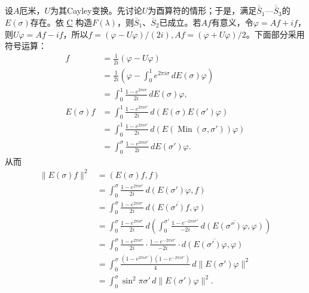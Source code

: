 \documentclass[fontsize=13pt,twoside,openany,headings=normal,parskip=false,bookmarkpackage=false,DIV=calc]{scrbook}
\begin{document}
设$A$厄米，$U$为其Cayley变换。先讨论$U$为酉算符的情形；于是，满足$\hyperref[cond:II.Sdouble1]{\overline{\overline S}_1}$—$\hyperref[cond:II.Sdouble3]{\overline{\overline S}_3}$的$E(\sigma)$存在。依 \hyperref[eq:II.9.C]{C} 构造$F(\lambda)$，则$\hyperref[cond:II.Sbar1]{\overline S_1}$、$\hyperref[cond:II.Sbar2]{\overline S_2}$已成立。若$Af$有意义，令$\varphi=Af+if$，则$U\varphi=Af-if$，所以$f=(\varphi-U\varphi)/(2i),\allowbreak Af=(\varphi+U\varphi)/2$。下面部分采用符号运算：
\begin{align*}
f&=\frac1{2i}(\varphi-U\varphi)\\
&=\frac1{2i}\left(\varphi-\int_0^1e^{2\pi i\sigma}\,dE(\sigma)\varphi\right)\\
&=\int_0^1\frac{1-e^{2\pi i\sigma}}{2i}\,dE(\sigma)\varphi,\\
E(\sigma)f&=\int_0^1\frac{1-e^{2\pi i\sigma'}}{2i}\,d(E(\sigma)E(\sigma')\varphi)\\
&=\int_0^1\frac{1-e^{2\pi i\sigma'}}{2i}\,d(E(\operatorname{Min}(\sigma,\sigma'))\varphi)\\
&=\int_0^\sigma\frac{1-e^{2\pi i\sigma'}}{2i}\,dE(\sigma')\varphi.
\end{align*}
从而
\begin{align*}
\|E(\sigma)f\|^2&=(E(\sigma)f,f)\\
&=\int_0^\sigma\frac{1-e^{2\pi i\sigma'}}{2i}\,d(E(\sigma')\varphi,f)\\
&=\int_0^\sigma\frac{1-e^{2\pi i\sigma'}}{2i}\,d\overline{(E(\sigma')f,\varphi)}\\
&=\int_0^\sigma\frac{1-e^{2\pi i\sigma'}}{2i}\,
d\left(\int_0^{\sigma'}\frac{1-e^{-2\pi i\sigma''}}{-2i}\,
d\overline{(E(\sigma'')\varphi,\varphi)}\right)\\
&=\int_0^\sigma\frac{1-e^{2\pi i\sigma'}}{2i}\cdot
\frac{1-e^{-2\pi i\sigma'}}{-2i}\cdot d\overline{(E(\sigma')\varphi,\varphi)}\\
&=\int_0^\sigma\frac{(1-e^{2\pi i\sigma'})(1-e^{-2\pi i\sigma'})}{4}\,
d\|E(\sigma')\varphi\|^2\\
&=\int_0^\sigma\sin^2\pi\sigma'\,d\|E(\sigma')\varphi\|^2.
\end{align*}
\end{document}
